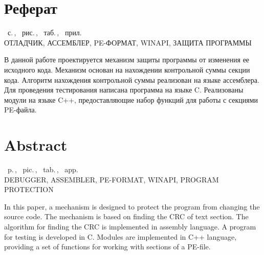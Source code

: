 \chapter*{Реферат}
\thispagestyle{empty}

\begin{center}
  \ztotpages\ с.\,, \totalfigures\ рис.\,, \totaltables\ таб.\,, 
  \totalappendixCounters\ прил.\\
  \vspace{4mm}
  \MakeUppercase{отладчик, ассемблер, PE-формат, WinAPI, защита программы}
\end{center}

В данной работе проектируется механизм защиты программы от изменения ее
исходного кода. Механизм основан на нахождении контрольной суммы секции кода.
Алгоритм нахождения контрольной суммы реализован на языке ассемблера. Для
проведения тестирования написана программа на языке C. Реализованы модули на
языке C++, предоставляющие набор функций для работы с секциями PE-файла.


\chapter*{Abstract}
\thispagestyle{empty}
\begin{center}
  \ztotpages\ p.\,, \totalfigures\ pic.\,, \totaltables\ tab.\,, 
  \totalappendixCounters\ app.\\
  \vspace{4mm}
  \MakeUppercase{debugger, assembler, PE-format, WinAPI, program protection}
\end{center}

In this paper, a mechanism is designed to protect the program from changing the
source code. The mechanism is based on finding the CRC of text section. The
algorithm for finding the CRC is implemented in assembly language. A program for
testing is developed in C. Modules are implemented in C++ language, providing a
set of functions for working with sections of a PE-file.

